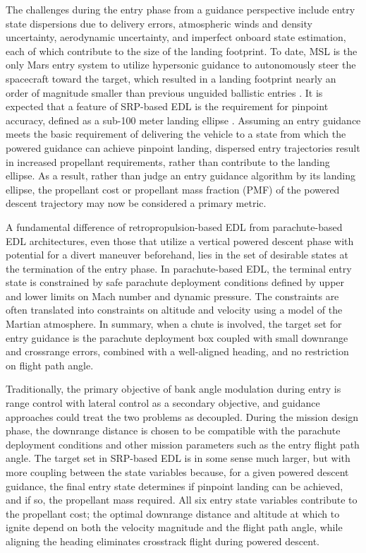 \documentclass[letterpaper, paper,11pt]{AAS}
\begin{document}
The challenges during the entry phase from a guidance perspective include entry state dispersions due to delivery errors, atmospheric winds and density uncertainty, aerodynamic uncertainty, and imperfect onboard state estimation, each of which contribute to the size of the landing footprint. To date, MSL is the only Mars entry system to utilize hypersonic guidance to autonomously steer the spacecraft toward the target, which resulted in a landing footprint nearly an order of magnitude smaller than previous unguided ballistic entries \cite{BraunMarsEDL}. 
It is expected that a feature of SRP-based EDL is the requirement for pinpoint accuracy, defined as a sub-100 meter landing ellipse \cite{GNC_Pinpoint}. Assuming an entry guidance meets the basic requirement of delivering the vehicle to a state from which the powered guidance can achieve pinpoint landing, dispersed entry trajectories result in increased propellant requirements, rather than contribute to the landing ellipse. As a result, rather than judge an entry guidance algorithm by its landing ellipse, the propellant cost or propellant mass fraction (PMF) of the powered descent trajectory may now be considered a primary metric.

A fundamental difference of retropropulsion-based EDL from parachute-based EDL architectures, even those that utilize a vertical powered descent phase with potential for a divert maneuver beforehand, lies in the set of desirable states at the termination of the entry phase. In parachute-based EDL, the terminal entry state is constrained by safe parachute deployment conditions defined by upper and lower limits on Mach number and dynamic pressure. The constraints are often translated into constraints on altitude and velocity using a model of the Martian atmosphere. In summary, when a chute is involved, the target set for entry guidance is the parachute deployment box coupled with small downrange and crossrange errors, combined with a well-aligned heading, and no restriction on flight path angle. 

Traditionally, the primary objective of bank angle modulation during entry is range control with lateral control as a secondary objective, and guidance approaches could treat the two problems as decoupled. During the mission design phase, the downrange distance is chosen to be compatible with the parachute deployment conditions and other mission parameters such as the entry flight path angle. The target set in SRP-based EDL is in some sense much larger, but with more coupling between the state variables because, for a given powered descent guidance, the final entry state determines if pinpoint landing can be achieved, and if so, the propellant mass required. All six entry state variables contribute to the propellant cost; the optimal downrange distance and altitude at which to ignite depend on both the velocity magnitude and the flight path angle, while aligning the heading eliminates crosstrack flight during powered descent. 
\end{document}
